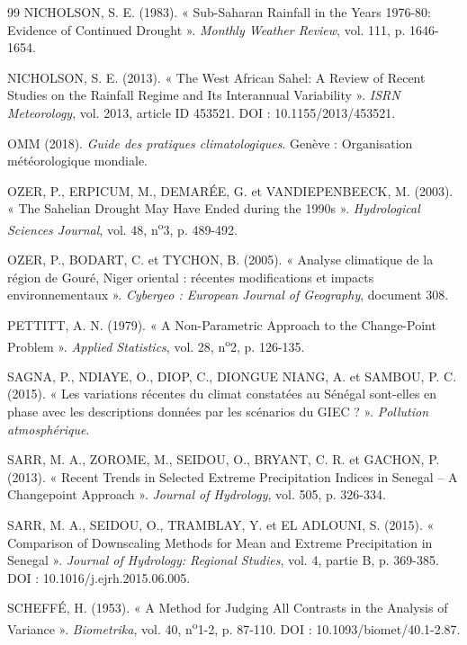 \documentclass[12pt,a4paper]{report}
\begin{document}
\begin{thebibliography}{99}
NICHOLSON, S. E. (1983). « Sub-Saharan Rainfall in the Years 1976-80: Evidence of Continued Drought ». \textit{Monthly Weather Review}, vol. 111, p. 1646-1654.

NICHOLSON, S. E. (2013). « The West African Sahel: A Review of Recent Studies on the Rainfall Regime and Its Interannual Variability ». \textit{ISRN Meteorology}, vol. 2013, article ID 453521. DOI : 10.1155/2013/453521.

OMM (2018). \textit{Guide des pratiques climatologiques}. Genève : Organisation météorologique mondiale.

OZER, P., ERPICUM, M., DEMARÉE, G. et VANDIEPENBEECK, M. (2003). « The Sahelian Drought May Have Ended during the 1990s ». \textit{Hydrological Sciences Journal}, vol. 48, n\textsuperscript{o}3, p. 489-492.

OZER, P., BODART, C. et TYCHON, B. (2005). « Analyse climatique de la région de Gouré, Niger oriental : récentes modifications et impacts environnementaux ». \textit{Cybergeo : European Journal of Geography}, document 308.

PETTITT, A. N. (1979). « A Non-Parametric Approach to the Change-Point Problem ». \textit{Applied Statistics}, vol. 28, n\textsuperscript{o}2, p. 126-135.

SAGNA, P., NDIAYE, O., DIOP, C., DIONGUE NIANG, A. et SAMBOU, P. C. (2015). « Les variations récentes du climat constatées au Sénégal sont-elles en phase avec les descriptions données par les scénarios du GIEC ? ». \textit{Pollution atmosphérique}.

SARR, M. A., ZOROME, M., SEIDOU, O., BRYANT, C. R. et GACHON, P. (2013). « Recent Trends in Selected Extreme Precipitation Indices in Senegal -- A Changepoint Approach ». \textit{Journal of Hydrology}, vol. 505, p. 326-334.

SARR, M. A., SEIDOU, O., TRAMBLAY, Y. et EL ADLOUNI, S. (2015). « Comparison of Downscaling Methods for Mean and Extreme Precipitation in Senegal ». \textit{Journal of Hydrology: Regional Studies}, vol. 4, partie B, p. 369-385. DOI : 10.1016/j.ejrh.2015.06.005.

SCHEFFÉ, H. (1953). « A Method for Judging All Contrasts in the Analysis of Variance ». \textit{Biometrika}, vol. 40, n\textsuperscript{o}1-2, p. 87-110. DOI : 10.1093/biomet/40.1-2.87.


\end{thebibliography}
\end{document}
